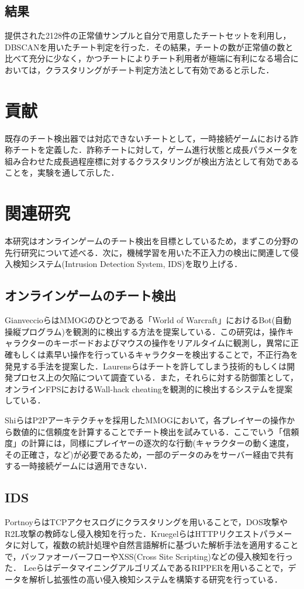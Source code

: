 \subsection{結果}
提供された2128件の正常値サンプルと自分で用意したチートセットを利用し，DBSCANを用いたチート判定を行った．その結果，チートの数が正常値の数と比べて充分に少なく，かつチートによりチート利用者が極端に有利になる場合においては，クラスタリングがチート判定方法として有効であると示した．

\section{貢献}
既存のチート検出器では対応できないチートとして，一時接続ゲームにおける詐称チートを定義した．詐称チートに対して，ゲーム進行状態と成長パラメータを組み合わせた成長過程座標に対するクラスタリングが検出方法として有効であることを，実験を通して示した．


\section{関連研究}
本研究はオンラインゲームのチート検出を目標としているため，まずこの分野の先行研究について述べる．次に，機械学習を用いた不正入力の検出に関連して侵入検知システム(Intrusion Detection System, IDS)を取り上げる．

\subsection{オンラインゲームのチート検出}
Gianveccioら\cite{botcraft}はMMOGのひとつである「World of Warcraft」におけるBot(自動操縦プログラム)を観測的に検出する方法を提案している．この研究は，操作キャラクターのキーボードおよびマウスの操作をリアルタイムに観測し，異常に正確もしくは素早い操作を行っているキャラクターを検出することで，不正行為を発見する手法を提案した．Laurensら\cite{gamefps}はチートを許してしまう技術的もしくは開発プロセス上の欠陥について調査ている．また，それらに対する防御策として，オンラインFPSにおけるWall-hack cheatingを観測的に検出するシステムを提案している．

Shiら\cite{gamep2p}はP2Pアーキテクチャを採用したMMOGにおいて，各プレイヤーの操作から数値的に信頼度を計算することでチート検出を試みている．ここでいう「信頼度」の計算には，同様にプレイヤーの逐次的な行動(キャラクターの動く速度，その正確さ，など)が必要であるため，一部のデータのみをサーバー経由で共有する一時接続ゲームには適用できない． 

\subsection{IDS}
Portnoyら\cite{cluster}はTCPアクセスログにクラスタリングを用いることで，DOS攻撃やR2L攻撃の教師なし侵入検知を行った．Kruegelら\cite{httplearn}はHTTPリクエストパラメータに対して，複数の統計処理や自然言語解析に基づいた解析手法を適用することで，バッファオーバーフローやXSS(Cross Site Scripting)などの侵入検知を行った．
Leeら\cite{mining}はデータマイニングアルゴリズムであるRIPPER\cite{ripper}を用いることで，データを解析し拡張性の高い侵入検知システムを構築する研究を行っている．
